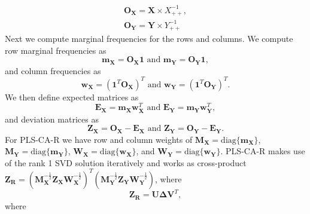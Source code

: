\documentclass[12pt]{article}
\begin{document}
\begin{equation}
\begin{aligned}
{\mathbf O}_{\mathbf X} = {\mathbf X} \times X_{++}^{-1}, \\
{\mathbf O}_{\mathbf Y} = {\mathbf Y} \times Y_{++}^{-1}
\label{eq:observedXY}
\end{aligned}
\end{equation} Next we compute marginal frequencies for the rows and
columns. We compute row marginal frequencies as \begin{equation}
{\mathbf m}_{\mathbf X} = {\mathbf O}_{\mathbf X}{\mathbf 1} \text{ and } {\mathbf m}_{\mathbf Y} = {\mathbf O}_{\mathbf Y}{\mathbf 1},
\label{eq:xy_rowvecs}
\end{equation} and column frequencies as \begin{equation}
{\mathbf w}_{\mathbf X} = ({\mathbf 1}^{T}{\mathbf O}_{\mathbf X})^{T} \text{ and } {\mathbf w}_{\mathbf Y} = ({\mathbf 1}^{T}{\mathbf O}_{\mathbf Y})^{T}.
\label{eq:weightmats_v1}
\end{equation} We then define expected matrices as \begin{equation}
{\mathbf E}_{\mathbf X} = {\mathbf m}_{\mathbf X}{\mathbf w}_{\mathbf X}^{T} \text{ and } {\mathbf E}_{\mathbf Y} = {\mathbf m}_{\mathbf Y}{\mathbf w}_{\mathbf Y}^{T},
\label{eq:models}
\end{equation} and deviation matrices as \begin{equation}
{\mathbf Z}_{\mathbf X} = {\mathbf O}_{\mathbf X} - {\mathbf E}_{\mathbf X} \text{ and } {\mathbf Z}_{\mathbf Y} = {\mathbf O}_{\mathbf Y} - {\mathbf E}_{\mathbf Y}.
\label{eq:plscar_Zs}
\end{equation} For PLS-CA-R we have row and column weights of
\({\mathbf M}_{\mathbf X} = \mathrm{diag\{}{\mathbf m}_{\mathbf X} \mathrm{\}}\),
\({\mathbf M}_{\mathbf Y} = \mathrm{diag\{}{\mathbf m}_{\mathbf Y} \mathrm{\}}\),
\({\mathbf W}_{\mathbf X} = \mathrm{diag\{}{\mathbf w}_{\mathbf X} \mathrm{\}}\),
and
\({\mathbf W}_{\mathbf Y} = \mathrm{diag\{}{\mathbf w}_{\mathbf Y} \mathrm{\}}\).
PLS-CA-R makes use of the rank 1 SVD solution iteratively and works as
cross-product
\({\mathbf Z}_{\mathbf R} = ({\mathbf M}_{\mathbf X}^{-\frac{1}{2}}{\mathbf Z}_{\mathbf X}{\mathbf W}_{\mathbf X}^{-\frac{1}{2}})^{T}({\mathbf M}_{\mathbf Y}^{-\frac{1}{2}}{\mathbf Z}_{\mathbf Y}{\mathbf W}_{\mathbf Y}^{-\frac{1}{2}})\),
where \begin{equation}
{\mathbf Z}_{\mathbf R} = {\mathbf U} {\boldsymbol \Delta} {\mathbf V}^{T},
\label{eq:the_svd_for_plscar}
\end{equation} where
\end{document}
